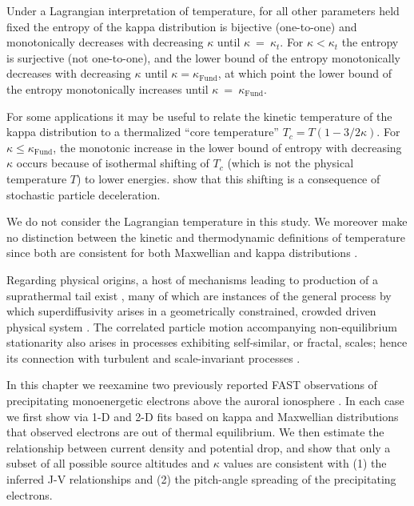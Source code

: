   Under a Lagrangian interpretation of temperature, for all other parameters
  held fixed the entropy of the kappa distribution is bijective (one-to-one) and
  monotonically decreases with decreasing $\kappa$ until $\kappa$~=~$\kappa_t$.
  For $\kappa < \kappa_t$ the entropy is surjective (not one-to-one), and the
  lower bound of the entropy monotonically decreases with decreasing $\kappa$
  until $\kappa = \kappa_{\textrm{Fund}}$, at which point the lower bound of the
  entropy monotonically increases until $\kappa$~=~$\kappa_{\textrm{Fund}}$. 

  For some applications \citep[e.g.,][]{Sutherland2012} it may be useful to
  relate the kinetic temperature of the kappa distribution to a thermalized
  ``core temperature'' $T_c = T (1-3/2 \kappa)$. For
  $\kappa \leq \kappa_{\textrm{Fund}}$, the monotonic increase in the lower
  bound of entropy with decreasing $\kappa$ occurs because of isothermal
  shifting of $T_c$ (which is not the physical temperature $T$) to lower
  energies. \citet{Livadiotis2010} show that this shifting is a consequence of
  stochastic particle deceleration.

  We do not consider the Lagrangian temperature in this study. We moreover make
  no distinction between the kinetic and thermodynamic definitions of
  temperature since both are consistent for both Maxwellian and kappa
  distributions \citep{Livadiotis2010}.

  Regarding physical origins, a host of mechanisms leading to production of a
  suprathermal tail exist \citep[e.g., review by][]{Pierrard2010}, many of which
  are instances of the general process by which superdiffusivity arises in a
  geometrically constrained, crowded driven physical system
  \citep{Benichou2013}.  The correlated particle motion accompanying
  non-equilibrium stationarity also arises in processes exhibiting self-similar,
  or fractal, scales; hence its connection with turbulent and scale-invariant
  processes \citep{West1990,Treumann1999a,Leubner2004}.

  In this chapter we reexamine two previously reported FAST observations of
  precipitating monoenergetic electrons above the auroral ionosphere
  \citep{Elphic1998,Ergun1998a}. In each case we first show via 1-D and 2-D fits
  based on kappa and Maxwellian distributions that observed electrons are out of
  thermal equilibrium. We then estimate the relationship between current density
  and potential drop, and show that only a subset of all possible source
  altitudes and $\kappa$ values are consistent with (1) the inferred J-V
  relationships and (2) the pitch-angle spreading of the precipitating
  electrons.

